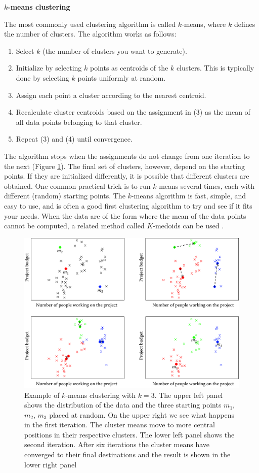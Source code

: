 \documentclass[]{krantz}
\begin{document}
\textbf{\(k\)-means clustering}

The most commonly used clustering algorithm is called \(k\)-means, where
\(k\) defines the number of clusters. The algorithm works as follows:

\begin{enumerate}
\def\labelenumi{\arabic{enumi}.}
\item
  Select \(k\) (the number of clusters you want to generate).
\item
  Initialize by selecting \(k\) points as centroids of the \(k\)
  clusters. This is typically done by selecting \(k\) points uniformly
  at random.
\item
  Assign each point a cluster according to the nearest centroid.
\item
  Recalculate cluster centroids based on the assignment in (3) as the
  mean of all data points belonging to that cluster.
\item
  Repeat (3) and (4) until convergence.
\end{enumerate}

The algorithm stops when the assignments do not change from one
iteration to the next (Figure \ref{fig:kmeans}). The final set of
clusters, however, depend on the starting points. If they are
initialized differently, it is possible that different clusters are
obtained. One common practical trick is to run \(k\)-means several
times, each with different (random) starting points. The \(k\)-means
algorithm is fast, simple, and easy to use, and is often a good first
clustering algorithm to try and see if it fits your needs. When the data
are of the form where the mean of the data points cannot be computed, a
related method called \(K\)-medoids can be used \citep{park2009simple}.

\begin{figure}

{\centering \includegraphics[width=0.7\linewidth]{ChapterML/figures/kmeans} 

}

\caption{Example of $k$-means clustering with $k = 3$. The upper left panel shows the distribution of the data and the three starting points $m_1$, $m_2$, $m_3$ placed at random. On the upper right we see what happens in the first iteration. The cluster means move to more central positions in their respective clusters. The lower left panel shows the second iteration. After six iterations the cluster means have converged to their final destinations and the result is shown in the lower right panel}\label{fig:kmeans}
\end{figure}
\end{document}
